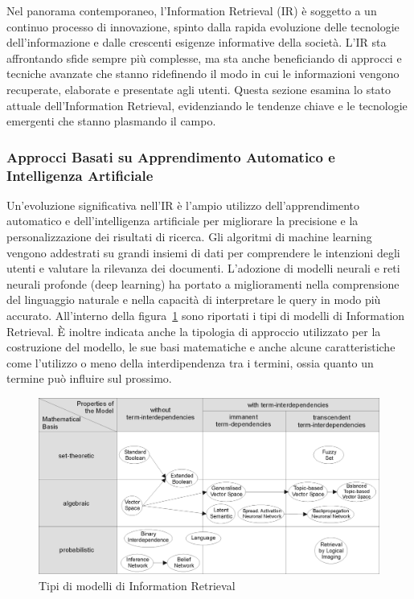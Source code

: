 Nel panorama contemporaneo, l'Information Retrieval (IR) è soggetto a un continuo processo di innovazione, spinto dalla rapida evoluzione delle tecnologie dell'informazione e dalle crescenti esigenze informative della società. L'IR sta affrontando sfide sempre più complesse, ma sta anche beneficiando di approcci e tecniche avanzate che stanno ridefinendo il modo in cui le informazioni vengono recuperate, elaborate e presentate agli utenti. Questa sezione esamina lo stato attuale dell'Information Retrieval, evidenziando le tendenze chiave e le tecnologie emergenti che stanno plasmando il campo.

\subsubsection{Approcci Basati su Apprendimento Automatico e Intelligenza Artificiale}
Un'evoluzione significativa nell'IR è l'ampio utilizzo dell'apprendimento automatico e dell'intelligenza artificiale per migliorare la precisione e la personalizzazione dei risultati di ricerca. Gli algoritmi di machine learning vengono addestrati su grandi insiemi di dati per comprendere le intenzioni degli utenti e valutare la rilevanza dei documenti. L'adozione di modelli neurali e reti neurali profonde (deep learning) ha portato a miglioramenti nella comprensione del linguaggio naturale e nella capacità di interpretare le query in modo più accurato.
All'interno della figura~\ref{fig:typesofmodel} sono riportati i tipi di modelli di Information Retrieval. È inoltre indicata anche la tipologia di approccio utilizzato per la costruzione del modello, le sue basi matematiche e anche alcune caratteristiche come l'utilizzo o meno della interdipendenza tra i termini, ossia quanto un termine può influire sul prossimo.

\begin{center}
    \begin{figure}[H]
        \centering
        \includegraphics{images/typesofmodel.png}
        \caption{Tipi di modelli di Information Retrieval}
        \label{fig:typesofmodel}
    \end{figure}
\end{center}

